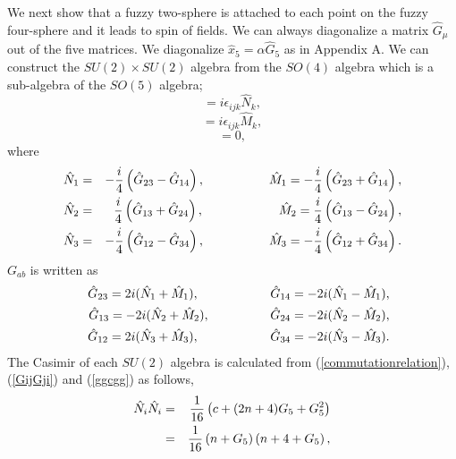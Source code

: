 \documentclass[a4paper,11pt]{article}
\begin{document}
We next show that a fuzzy two-sphere is attached to each point 
on the fuzzy four-sphere\cite{horamgooram} 
and it leads to spin of fields. 
We can always diagonalize a matrix $\hat{G}_{\mu}$ 
out of the five matrices. 
We diagonalize $\hat{x}_{5}=\alpha\hat{G}_{5}$ 
as in Appendix A. 
We can construct the $SU(2)\times SU(2)$ algebra from 
the $SO(4)$ algebra 
which is a sub-algebra of the $SO(5)$ algebra; 
\begin{equation}
[\hat{N}_{i},\hat{N}_{j}]=i\epsilon_{ijk}\hat{N}_{k}, 
\end{equation} 
\begin{equation}
[\hat{M}_{i},\hat{M}_{j}]=i\epsilon_{ijk}\hat{M}_{k}, 
\end{equation}
\begin{equation}
[\hat{M}_{i},\hat{N}_{j}]=0,  
\end{equation}
where 
\begin{eqnarray}
\hat{N}_{1}&=&-\frac{i}{4}\left(\hat{G}_{23}-\hat{G}_{14}\right), 
\hspace{1.8cm}
\hat{M}_{1}=-\frac{i}{4}\left(\hat{G}_{23}+\hat{G}_{14}\right), \cr 
\hat{N}_{2}&=&\frac{i}{4}\left(\hat{G}_{13}+\hat{G}_{24}\right),  
\hspace{2.1cm}
\hat{M}_{2}=\frac{i}{4}\left(\hat{G}_{13}-\hat{G}_{24}\right), \cr 
\hat{N}_{3}&=&-\frac{i}{4}\left(\hat{G}_{12}-\hat{G}_{34}\right), 
\hspace{1.8cm}
\hat{M}_{3}=-\frac{i}{4}\left(\hat{G}_{12}+\hat{G}_{34}\right) .
\end{eqnarray}
$G_{ab}$ is written as 
\begin{eqnarray}
&&\hat{G}_{23}=2i (\hat{N}_{1}+\hat{M}_{1}),
\hspace{2cm}
\hat{G}_{14}=-2i(\hat{N}_{1}-\hat{M}_{1}), \cr
&&\hat{G}_{13}= -2i(\hat{N}_{2}+\hat{M}_{2}),
\hspace{1.7cm}
\hat{G}_{24} =-2i(\hat{N}_{2}-\hat{M}_{2}),\cr
&&\hat{G}_{12} =2i(\hat{N}_{3}+\hat{M}_{3}),
\hspace{2cm}
\hat{G}_{34}=-2i(\hat{N}_{3}-\hat{M}_{3}). 
\end{eqnarray}
The Casimir of each $SU(2)$ algebra is calculated from 
(\ref{commutationrelation}), 
(\ref{GijGji}) and (\ref{ggcgg}) as follows, 
\begin{eqnarray}
\hat{N}_{i}\hat{N}_{i}
&=&\frac{1}{16}\left(
c+(2n+4)G_{5}+G_{5}^{2}\right) \cr
&=&\frac{1}{16}\left(
n+G_{5}\right)\left( n+4+G_{5}\right), 
\end{eqnarray}
\end{document}
